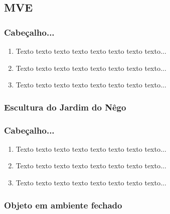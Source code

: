 \documentclass[table, usenames, svgnames, dvipsnames]{beamer}
\begin{document}
\subsection{MVE}

\begin{frame}
\frametitle{Cabeçalho...}
	\begin{enumerate}
    	\item Texto texto texto texto texto texto texto texto...
		\\[0.5em]

    	\item Texto texto texto texto texto texto texto texto...
		\\[0.5em]
    	
		\item Texto texto texto texto texto texto texto texto...
		\\[0.5em]
	\end{enumerate}
\end{frame}

\subsubsection{Escultura do Jardim do Nêgo}

\begin{frame}
\frametitle{Cabeçalho...}
	\begin{enumerate}
    	\item Texto texto texto texto texto texto texto texto...
		\\[0.5em]

    	\item Texto texto texto texto texto texto texto texto...
		\\[0.5em]
    	
		\item Texto texto texto texto texto texto texto texto...
		\\[0.5em]
	\end{enumerate}
\end{frame}


\subsubsection{Objeto em ambiente fechado}
\end{document}
